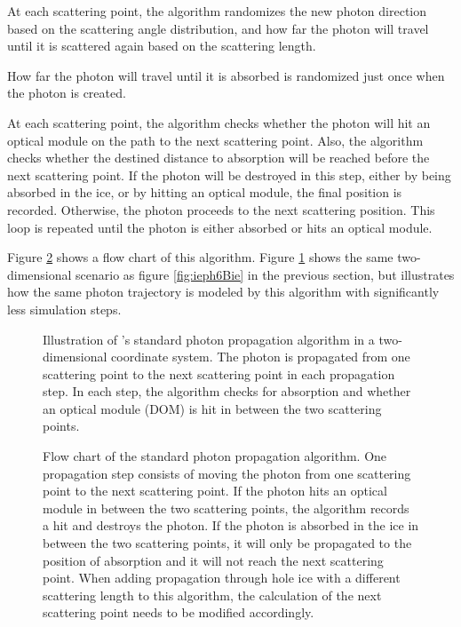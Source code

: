 At each scattering point, the algorithm randomizes the new photon direction based on the scattering angle distribution, and how far the photon will travel until it is scattered again based on the scattering length.

How far the photon will travel until it is absorbed is randomized just once when the photon is created.

At each scattering point, the algorithm checks whether the photon will hit an optical module on the path to the next scattering point. Also, the algorithm checks whether the destined distance to absorption will be reached before the next scattering point. If the photon will be destroyed in this step, either by being absorbed in the ice, or by hitting an optical module, the final position is recorded. Otherwise, the photon proceeds to the next scattering position. This loop is repeated until the photon is either absorbed or hits an optical module. \cite{ppcpaper}

Figure \ref{fig:Ar0vai8u} shows a flow chart of this algorithm. Figure \ref{fig:oheeL3ai} shows the same two-dimensional scenario as figure \ref{fig:ieph6Bie} in the previous section, but illustrates how the same photon trajectory is modeled by this algorithm with significantly less simulation steps.

\begin{figure}[htbp]
  \caption{Illustration of \icecube's standard photon propagation algorithm in a two-dimensional coordinate system. The photon is propagated from one scattering point to the next scattering point in each propagation step. In each step, the algorithm checks for absorption and whether an optical module (DOM) is hit in between the two scattering points.}
  \label{fig:oheeL3ai}
\end{figure}

\begin{figure}[p]
  \caption{Flow chart of the standard photon propagation algorithm. One propagation step consists of moving the photon from one scattering point to the next scattering point. If the photon hits an optical module in between the two scattering points, the algorithm records a hit and destroys the photon. If the photon is absorbed in the ice in between the two scattering points, it will only be propagated to the position of absorption and it will not reach the next scattering point. When adding propagation through hole ice with a different scattering length to this algorithm, the calculation of the next scattering point needs to be modified accordingly.}
  \label{fig:Ar0vai8u}
\end{figure}

